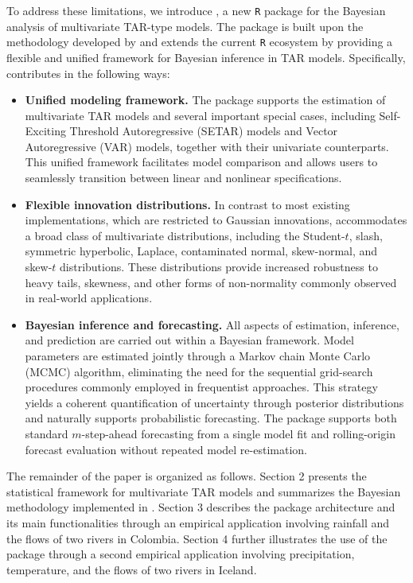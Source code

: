 To address these limitations, we introduce , a new {\tt R} package for the Bayesian analysis of multivariate TAR-type models. The package is built upon the methodology developed by \cite{VANEGAS2025} and extends the current {\tt R} ecosystem by providing a flexible and unified framework for Bayesian inference in TAR models. Specifically,  contributes in the following ways:
\begin{itemize}
\item {\bf Unified modeling framework.} The package supports the estimation of multivariate TAR models and several important special cases, including Self-Exciting Threshold Autoregressive (SETAR) models and Vector Autoregressive (VAR) models, together with their univariate counterparts. This unified framework facilitates model comparison and allows users to seamlessly transition between linear and nonlinear specifications.

\item {\bf Flexible innovation distributions.} In contrast to most existing implementations, which are restricted to Gaussian innovations,  accommodates a broad class of multivariate distributions, including the Student-$t$, slash, symmetric hyperbolic, Laplace, contaminated normal, skew-normal, and skew-$t$ distributions. These distributions provide increased robustness to heavy tails, skewness, and other forms of non-normality commonly observed in real-world applications.

\item {\bf Bayesian inference and forecasting.} All aspects of estimation, inference, and prediction are carried out within a Bayesian framework. Model parameters are estimated jointly through a Markov chain Monte Carlo (MCMC) algorithm, eliminating the need for the sequential grid-search procedures commonly employed in frequentist approaches. This strategy yields a coherent quantification of uncertainty through posterior distributions and naturally supports probabilistic forecasting. The package supports both standard $m$-step-ahead forecasting from a single model fit and rolling-origin forecast evaluation without repeated model re-estimation.
\end{itemize}

The remainder of the paper is organized as follows. Section 2 presents the statistical framework for multivariate TAR models and summarizes the Bayesian methodology implemented in . Section 3 describes the package architecture and its main functionalities through an empirical application involving rainfall and the flows of two rivers in Colombia. Section 4 further illustrates the use of the package through a second empirical application involving precipitation, temperature, and the flows of two rivers in Iceland.

